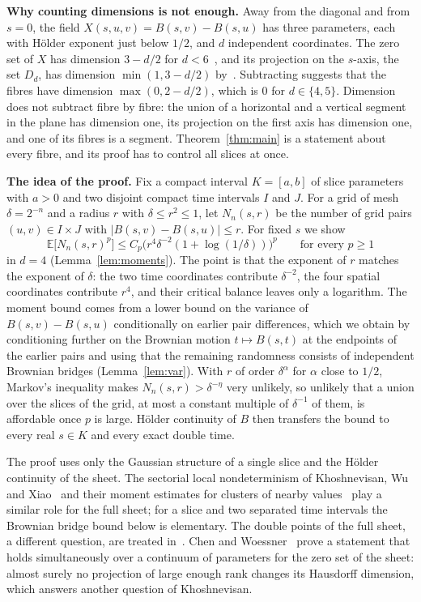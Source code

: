 \documentclass[11pt]{amsart}
\theoremstyle{remark}
\newcommand{\E}{\mathbb{E}}
\begin{document}
\textbf{Why counting dimensions is not enough.} Away from the diagonal and from $s=0$, the field
$X(s,u,v)=B(s,v)-B(s,u)$ has three parameters, each with H\"older exponent just below $1/2$, and $d$ independent
coordinates. The zero set of $X$ has dimension $3-d/2$ for $d<6$~\cite[Theorem~5.1 and (8.1)]{Kho05}, and its
projection on the $s$-axis, the set $D_d$, has dimension $\min(1,3-d/2)$ by~\cite[(1.12)]{Kho05}. Subtracting
suggests that the fibres have dimension $\max(0,2-d/2)$, which is $0$ for $d\in\{4,5\}$. Dimension does not subtract
fibre by fibre: the union of a horizontal and a vertical segment in the plane has dimension one, its projection on the
first axis has dimension one, and one of its fibres is a segment. Theorem~\ref{thm:main} is a statement about every
fibre, and its proof has to control all slices at once.

\textbf{The idea of the proof.} Fix a compact interval $K=[a,b]$ of slice parameters with $a>0$ and two disjoint
compact time intervals $I$ and $J$. For a grid of mesh $\delta=2^{-n}$ and a radius $r$ with $\delta\le r^2\le1$, let
$N_n(s,r)$ be the number of grid pairs $(u,v)\in I\times J$ with $|B(s,v)-B(s,u)|\le r$. For fixed $s$ we show
\[
\E\bigl[N_n(s,r)^p\bigr]\le C_p\bigl(r^4\delta^{-2}(1+\log(1/\delta))\bigr)^p
\qquad\text{for every }p\ge1
\]
in $d=4$ (Lemma~\ref{lem:moments}). The point is that the exponent of $r$ matches the exponent of $\delta$: the two time
coordinates contribute $\delta^{-2}$, the four spatial coordinates contribute $r^4$, and their critical balance leaves
only a logarithm. The moment bound comes from a lower bound on the variance of $B(s,v)-B(s,u)$ conditionally on earlier
pair differences, which we obtain by conditioning further on the Brownian motion $t\mapsto B(s,t)$ at the endpoints of
the earlier pairs and using that the remaining randomness consists of independent Brownian bridges
(Lemma~\ref{lem:var}). With $r$ of order $\delta^{\alpha}$ for $\alpha$ close to $1/2$, Markov's inequality makes
$N_n(s,r)>\delta^{-\eta}$ very unlikely, so unlikely that a union over the slices of the grid, at most a constant multiple of $\delta^{-1}$ of them, is
affordable once $p$ is large. H\"older continuity of $B$ then transfers the bound to every real $s\in K$ and every exact
double time.

The proof uses only the Gaussian structure of a single slice and the H\"older continuity of the sheet. The sectorial
local nondeterminism of Khoshnevisan, Wu and Xiao~\cite[Lemma~1.1]{KWX06} and their moment estimates for clusters of
nearby values~\cite[Lemma~3.1]{KWX06} play a similar role for the full sheet; for a slice and two separated time
intervals the Brownian bridge bound below is elementary. The double points of the full sheet, a different question, are
treated in~\cite{DKNWX12,DM15}. Chen and Woessner~\cite{CW25} prove a statement that holds simultaneously over a
continuum of parameters for the zero set of the sheet: almost surely no projection of large enough rank changes its
Hausdorff dimension, which answers another question of Khoshnevisan.
\end{document}
